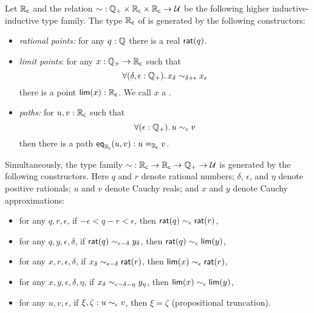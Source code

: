 \begin{defn}\label{defn:cauchy-reals}
  Let $\RC$ and the relation $\closesym:\Qp \times \RC \times \RC \to \type$ be the following higher inductive-inductive type family.
  The type $\RC$ of  is generated by the following constructors:
  \begin{itemize}
  \item \emph{rational points:} 
    for any $q : \Q$ there is a real $\rcrat(q)$.
  \item \emph{limit points}:
    for any $x : \Qp \to \RC$ such that
    \begin{equation}
      \label{eq:RC-cauchy}
      \fall{\delta, \epsilon : \Qp} x_\delta \close{\delta + \epsilon} x_\epsilon
    \end{equation}
    there is a point $\rclim(x) : \RC$. We call $x$ a .
  \item \emph{paths:}
    for $u, v : \RC$ such that
    \begin{equation}
      \label{eq:RC-path}
      \fall{\epsilon : \Qp} u \close\epsilon v
    \end{equation}
    then there is a path $\rceq(u, v) : \id[\RC]{u}{v}$.
  \end{itemize}
  Simultaneously, the type family $\closesym:\RC\to\RC\to\Qp \to\type$ is generated by the following constructors.
  Here $q$ and $r$ denote rational numbers; $\delta$, $\epsilon$, and $\eta$ denote positive rationals; $u$ and $v$ denote Cauchy reals; and $x$ and $y$ denote Cauchy approximations:
  \begin{itemize}
  \item for any $q,r,\epsilon$, if $-\epsilon < q - r < \epsilon$, then $\rcrat(q) \close\epsilon \rcrat(r)$,
  \item for any $q,y,\epsilon,\delta$, if $\rcrat(q) \close{\epsilon - \delta} y_\delta$, then $\rcrat(q) \close{\epsilon} \rclim(y)$,
  \item for any $x,r,\epsilon,\delta$, if $x_\delta \close{\epsilon - \delta} \rcrat(r)$, then $\rclim(x) \close\epsilon \rcrat(r)$,
  \item for any $x,y,\epsilon,\delta,\eta$, if $x_\delta \close{\epsilon - \delta - \eta} y_\eta$, then $\rclim(x) \close\epsilon \rclim(y)$,
  \item for any $u,v,\epsilon$, if $\xi,\zeta : u \close{\epsilon} v$, then $\xi=\zeta$ (propositional truncation).
  \end{itemize}
\end{defn}

